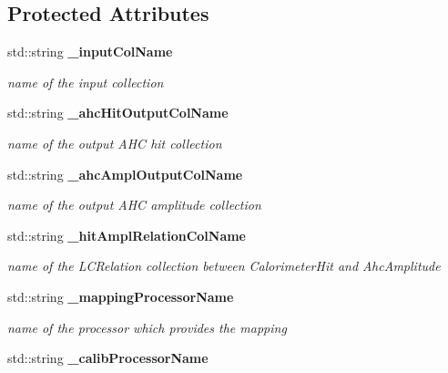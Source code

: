\subsection*{Protected Attributes}
\begin{DoxyCompactItemize}
\item 
std\-::string {\bf \-\_\-input\-Col\-Name}\label{classCALICE_1_1SiPMCalibrateProcessor_a57a43fb9e621a67f048f8d7e3eb422fc}

\begin{DoxyCompactList}\small\item\em name of the input collection \end{DoxyCompactList}\item 
std\-::string {\bf \-\_\-ahc\-Hit\-Output\-Col\-Name}\label{classCALICE_1_1SiPMCalibrateProcessor_aab19ab03aed4e1d2c55517553b01a7bf}

\begin{DoxyCompactList}\small\item\em name of the output A\-H\-C hit collection \end{DoxyCompactList}\item 
std\-::string {\bf \-\_\-ahc\-Ampl\-Output\-Col\-Name}\label{classCALICE_1_1SiPMCalibrateProcessor_ab050d98ccbef256701d52f6bcdbe7360}

\begin{DoxyCompactList}\small\item\em name of the output A\-H\-C amplitude collection \end{DoxyCompactList}\item 
std\-::string {\bf \-\_\-hit\-Ampl\-Relation\-Col\-Name}\label{classCALICE_1_1SiPMCalibrateProcessor_a48052d44b45a93f7d1e247e844f311b6}

\begin{DoxyCompactList}\small\item\em name of the L\-C\-Relation collection between Calorimeter\-Hit and Ahc\-Amplitude \end{DoxyCompactList}\item 
std\-::string {\bf \-\_\-mapping\-Processor\-Name}\label{classCALICE_1_1SiPMCalibrateProcessor_a17f68ea31684ff76170b3878eefb1558}

\begin{DoxyCompactList}\small\item\em name of the processor which provides the mapping \end{DoxyCompactList}\item 
std\-::string {\bf \-\_\-calib\-Processor\-Name}\label{classCALICE_1_1SiPMCalibrateProcessor_a0b8de01a32b442f302706d5678b0bed7}


\end{DoxyCompactItemize}
